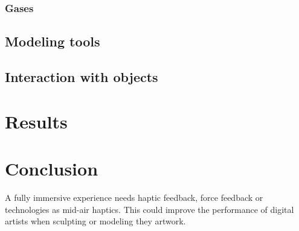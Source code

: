 \documentclass{vgtc}                          %
\begin{document}
\subsubsection{Gases}
\subsection{Modeling tools}
\subsection{Interaction with objects}
\section{Results}
\section{Conclusion}

A fully immersive experience needs haptic feedback, force feedback or technologies as mid-air haptics. This could improve the performance of digital artists when sculpting or modeling they artwork.




%

%
%
%


\end{document}
